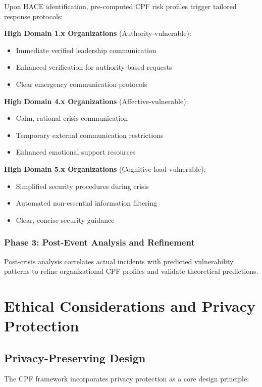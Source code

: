 \documentclass[11pt,a4paper]{article}
\begin{document}
Upon HACE identification, pre-computed CPF risk profiles trigger tailored response protocols:

\textbf{High Domain 1.x Organizations} (Authority-vulnerable):
\begin{itemize}
\item Immediate verified leadership communication
\item Enhanced verification for authority-based requests
\item Clear emergency communication protocols
\end{itemize}

\textbf{High Domain 4.x Organizations} (Affective-vulnerable):
\begin{itemize}
\item Calm, rational crisis communication
\item Temporary external communication restrictions
\item Enhanced emotional support resources
\end{itemize}

\textbf{High Domain 5.x Organizations} (Cognitive load-vulnerable):
\begin{itemize}
\item Simplified security procedures during crisis
\item Automated non-essential information filtering
\item Clear, concise security guidance
\end{itemize}

\subsubsection{Phase 3: Post-Event Analysis and Refinement}

Post-crisis analysis correlates actual incidents with predicted vulnerability patterns to refine organizational CPF profiles and validate theoretical predictions.

\section{Ethical Considerations and Privacy Protection}

\subsection{Privacy-Preserving Design}

The CPF framework incorporates privacy protection as a core design principle:
\end{document}
